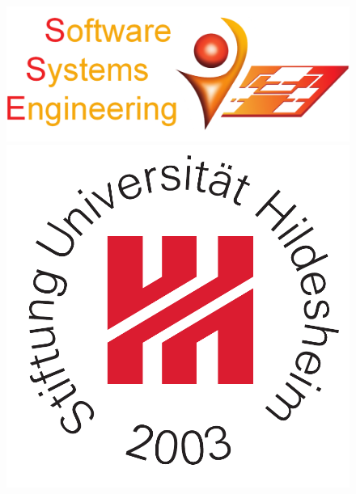 \begin{titlepage}
\begin{figure}
    \begin{minipage}{0.2\textwidth}
        \begin{flushleft}    
            \includegraphics[scale=0.22]{Bilder/SSE_logo_2000_resized.pdf}
        \end{flushleft}
    \end{minipage}  
    \begin{minipage}{0.55\textwidth}
        \centering
        \hspace{0.25cm}
    \end{minipage}
    \begin{minipage}{0.2\textwidth}
        \begin{flushleft}   
            \includegraphics[scale=0.25]{Bilder/St_Uni-Logo-9-2003-eps-converted-to.pdf}

\end{flushleft}
\end{minipage}
\end{figure}
\end{titlepage}
